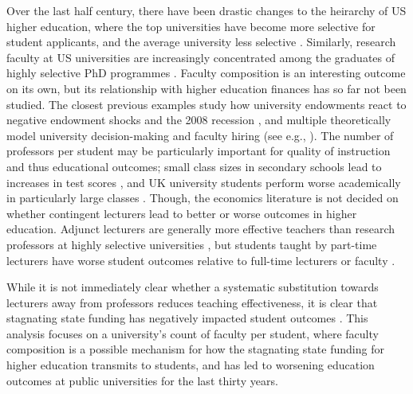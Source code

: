 Over the last half century, there have been drastic changes to the heirarchy of US higher education, where the top universities have become more selective for student applicants, and the average university less selective \citep{hoxby2009changing}.
Similarly, research faculty at US universities are increasingly concentrated among the graduates of highly selective PhD programmes \citep{wapman2022quantifying}.
Faculty composition is an interesting outcome on its own, but its relationship with higher education finances has so far not been studied.
The closest previous examples study  how university endowments react to negative endowment shocks \citep{brown2014endowment} and the 2008 recession \citep{turner2014impact}, and multiple theoretically model university decision-making and faculty hiring (see e.g., \citealt{abe2015implications,johnson2009jep,NBERc13879}).
The number of professors per student may be particularly important for quality of instruction and thus educational outcomes;
small class sizes in secondary schools lead to increases in test scores \citep{angrist1999using}, and UK university students perform worse academically in particularly large classes \citep{bandiera2010heterogeneous}.
Though, the economics literature is not decided on whether contingent lecturers lead to better or worse outcomes in higher education.
Adjunct lecturers are generally more effective teachers than research professors at highly selective universities \citep{bettinger2010does,figlio2015tenure}, but students taught by part-time lecturers have worse student outcomes relative to full-time lecturers or faculty \citep{zhu2021limited,ehrenberg2005tenured}.

While it is not immediately clear whether a systematic substitution towards lecturers away from professors reduces teaching effectiveness, it is clear that stagnating state funding has negatively impacted student outcomes \citep{NBERw23736,NBERw27885}.
This analysis focuses on a university's count of faculty per student, where faculty composition is a possible mechanism for how the stagnating state funding for higher education transmits to students, and has led to worsening education outcomes at public universities for the last thirty years.
